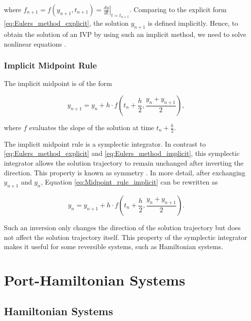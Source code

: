 \documentclass[
	parskip, 			   %
	twoside, 			   %
	DIV=14, 			   %
	BCOR=15.0mm, 		   %
	headsepline, 		   %
	open=right, 		   %
	captions=tableheading, %
	bibliography=totoc,    %
	numbers=noenddot       %
]{scrreprt}
\begin{document}
where $f_{n+1} = f(y_{n+1}, t_{n+1}) = \left. \frac{dy}{dt} \right|_{t=t_{n+1}}$. Comparing to the explicit form \ref{eq:Eulers_method_explicit}, the solution $y_{n+1}$ is defined implicitly. Hence, to obtain the solution of an IVP by using such an implicit method, we need to solve nonlinear equations \cite{hairer2006geometric}.

\subsection{Implicit Midpoint Rule}
The implicit midpoint is of the form

\begin{equation}
    \label{eq:Midpoint_rule_implicit}
    y_{n+1} = y_{n} + h \cdot f(t_{n}+\frac{h}{2} ,\frac{y_{n} + y_{n+1}}{2}),
\end{equation}

where $f$ evaluates the slope of the solution at time $t_{n}+\frac{h}{2}$.

The implicit midpoint rule is a symplectic integrator. In contrast to \ref{eq:Eulers_method_explicit} and \ref{eq:Eulers_method_implicit}, this symplectic integrator allows the solution trajectory to remain unchanged after inverting the direction. This property is known as symmetry \cite{hairer2006geometric}. In more detail, after exchanging $y_{n+1}$ and $y_{n}$, Equation \ref{eq:Midpoint_rule_implicit} can be rewritten as

\begin{equation}
    \label{eq:Midpoint_rule_implicit_inverted}
    y_{n} = y_{n+1} + h \cdot f(t_{n}+\frac{h}{2} ,\frac{y_{n} + y_{n+1}}{2}).
\end{equation}

Such an inversion only changes the direction of the solution trajectory but does not affect the solution trajectory itself. This property of the symplectic integrator makes it useful for some reversible systems, such as Hamiltonian systems.

\clearpage
\chapter{Port-Hamiltonian Systems}
\label{ch:chapter3}

\section{Hamiltonian Systems}
\end{document}
